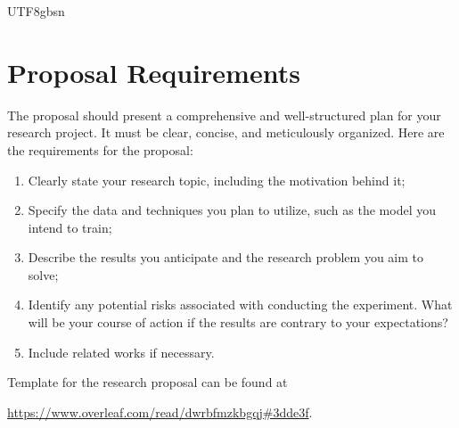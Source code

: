 \documentclass{article}%
\begin{document}
\begin{CJK}{UTF8}{gbsn}





\section{Proposal Requirements}
\label{sec: proposal requirements}

The proposal should present a comprehensive and well-structured plan for your research project. It must be clear, concise, and meticulously organized. Here are the requirements for the proposal:

\begin{enumerate}
    \item Clearly state your research topic, including the motivation behind it;
    \item Specify the data and techniques you plan to utilize, such as the model you intend to train;
    \item Describe the results you anticipate and the research problem you aim to solve;
    \item Identify any potential risks associated with conducting the experiment. What will be your course of action if the results are contrary to your expectations?
    \item Include related works if necessary.
\end{enumerate}

Template for the research proposal can be found at 

\url{https://www.overleaf.com/read/dwrbfmzkbgqj#3dde3f}.








\end{CJK}
\end{document}
